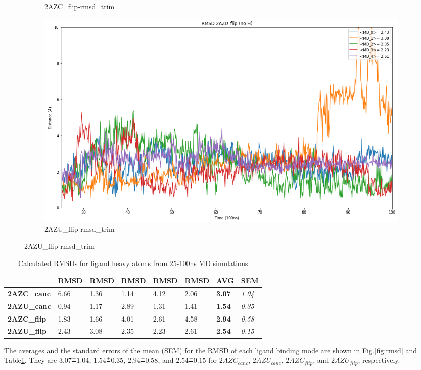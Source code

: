 \documentclass[fleqn,10pt]{wlscirep}
\begin{document}
\begin{figure}[!ht]
\begin{subfigure}{.45\textwidth}
     \caption{2AZC_{flip}-rmsd_trim}
     \label{fig:2AZC_flip-rmsd_trim}
   \end{subfigure}
    \begin{subfigure}{.45\textwidth}
     \centering
     \includegraphics[width=.95\linewidth]{2AZU_flip/2AZU_flip-rmsd-trim.png}
     \caption{2AZU_{flip}-rmsd_trim}
     \label{fig:2AZU_flip-rmsd_trim}
   \end{subfigure}
\end{figure}  

\begin{table}[!ht]
\caption{Calculated RMSDs for ligand heavy atoms from 25-100ns MD simulations}
\label{table:rmsd}
\begin{tabular}{|l|l|l|l|l|l|l|l|}
\hline
                    & RMSD & RMSD & RMSD & RMSD & RMSD & \textbf{AVG}  & SEM           \\ \hline
\textbf{2AZC\_canc} & 6.66 & 1.36 & 1.14 & 4.12 & 2.06 & \textbf{3.07} & \textit{1.04} \\ \hline
\textbf{2AZU\_canc} & 0.94 & 1.17 & 2.89 & 1.31 & 1.41 & \textbf{1.54} & \textit{0.35} \\ \hline
\textbf{2AZC\_flip} & 1.83 & 1.66 & 4.01 & 2.61 & 4.58 & \textbf{2.94} & \textit{0.58} \\ \hline
\textbf{2AZU\_flip} & 2.43 & 3.08 & 2.35 & 2.23 & 2.61 & \textbf{2.54} & \textit{0.15} \\ \hline

\end{tabular}
\end{table}

The averages and the standard errors of the mean (SEM) for the RMSD of each ligand binding mode are shown in Fig.\ref{fig:rmsd} and Table\ref{table:rmsd}.
They are $3.07 \frac{+}{-} 1.04$, $1.54 \frac{+}{-} 0.35$, $2.94 \frac{+}{-} 0.58$, and $2.54 \frac{+}{-} 0.15$ for $2AZC_{canc}$, $2AZU_{canc}$, $2AZC_{flip}$, and $2AZU_{flip}$, respectively.
\end{document}
